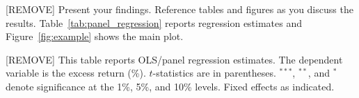 \documentclass[12pt]{article}
\begin{document}
[REMOVE] Present your findings. Reference tables and figures as you
discuss the results. Table~\ref{tab:panel_regression} reports regression
estimates and Figure~\ref{fig:example} shows the main plot.

\begin{table}[!ht]
\caption{[REMOVE] Regression Results.}
{\footnotesize
[REMOVE] This table reports OLS/panel regression estimates. The
dependent variable is the excess return (\%). $t$-statistics are in
parentheses. $^{***}$, $^{**}$, and $^{*}$ denote significance at the
1\%, 5\%, and 10\% levels. Fixed effects as indicated.}
\vspace{2mm}
\begin{center}
\label{tab:panel_regression}
\end{center}
\end{table}
\end{document}
